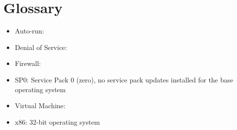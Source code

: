 \section{Glossary}

\begin{itemize}
\item Auto-run:
\item Denial of Service:
\item Firewall:
\item SP0: Service Pack 0 (zero), no service pack updates installed for the base operating system
\item Virtual Machine:
\item x86: 32-bit operating system
\end{itemize}